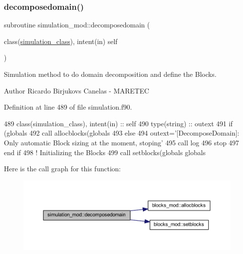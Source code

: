 \subsubsection{\texorpdfstring{decomposedomain()}{decomposedomain()}}
{\footnotesize\ttfamily subroutine simulation\+\_\+mod\+::decomposedomain (\begin{DoxyParamCaption}\item[{class(\mbox{\hyperlink{structsimulation__mod_1_1simulation__class}{simulation\+\_\+class}}), intent(in)}]{self }\end{DoxyParamCaption})\hspace{0.3cm}{\ttfamily [private]}}



Simulation method to do domain decomposition and define the Blocks. 

\begin{DoxyAuthor}{Author}
Ricardo Birjukovs Canelas -\/ M\+A\+R\+E\+T\+EC 
\end{DoxyAuthor}


Definition at line 489 of file simulation.\+f90.


\begin{DoxyCode}
489     \textcolor{keywordtype}{class}(simulation\_class), \textcolor{keywordtype}{intent(in)} :: self
490     \textcolor{keywordtype}{type}(string) :: outext
491     \textcolor{keywordflow}{if} (globals%
492         \textcolor{keyword}{call }allocblocks(globals%
493     \textcolor{keywordflow}{else}
494         outext=\textcolor{stringliteral}{'[DecomposeDomain]: Only automatic Block sizing at the moment, stoping'}
495         \textcolor{keyword}{call }log%
496         stop
497 \textcolor{keywordflow}{    end if}
498     \textcolor{comment}{! Initializing the Blocks}
499     \textcolor{keyword}{call }setblocks(globals%
      globals%
\end{DoxyCode}
Here is the call graph for this function\+:\nopagebreak
\begin{figure}[H]
\begin{center}
\leavevmode
\includegraphics[width=350pt]{namespacesimulation__mod_a2b8198a9fb3f7671c6b45192a0b9740c_cgraph}
\end{center}
\end{figure}
\mbox{\label{namespacesimulation__mod_a0ad485eab624ffa4df282f1da8d9f214}} 
